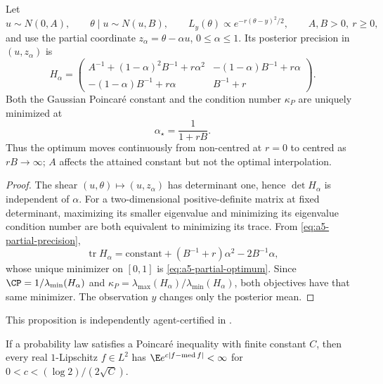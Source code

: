 \documentclass[../../main.tex]{subfiles}
\begin{document}
\begin{proposition}
\label{prop:a5-partial-gaussian}
Let
\[
 u\sim N(0,A),\qquad \theta\mid u\sim N(u,B),\qquad
 L_y(\theta)\propto e^{-r(\theta-y)^2/2},
 \qquad A,B>0,\ r\ge0,
\]
and use the partial coordinate $z_\alpha=\theta-\alpha u$, $0\le\alpha\le1$. Its posterior
precision in $(u,z_\alpha)$ is
\begin{equation}\label{eq:a5-partial-precision}
 H_\alpha=
 \begin{pmatrix}
 A^{-1}+(1-\alpha)^2B^{-1}+r\alpha^2&-(1-\alpha)B^{-1}+r\alpha\\
 -(1-\alpha)B^{-1}+r\alpha&B^{-1}+r
 \end{pmatrix}.
\end{equation}
Both the Gaussian Poincar\'e constant and the condition number $\kappa_P$ are uniquely minimized
at
\begin{equation}\label{eq:a5-partial-optimum}
 \boxed{\alpha_\star=\frac{1}{1+rB}.}
\end{equation}
Thus the optimum moves continuously from non-centred at $r=0$ to centred as $rB\to\infty$;
$A$ affects the attained constant but not the optimal interpolation.
\end{proposition}

\begin{proof}
The shear $(u,\theta)\mapsto(u,z_\alpha)$ has determinant one, hence
$\det H_\alpha$ is independent of $\alpha$. For a two-dimensional positive-definite matrix at
fixed determinant, maximizing its smaller eigenvalue and minimizing its eigenvalue condition
number are both equivalent to minimizing its trace. From \eqref{eq:a5-partial-precision},
\[
 \operatorname{tr}H_\alpha
 =\text{constant}+(B^{-1}+r)\alpha^2-2B^{-1}\alpha,
\]
whose unique minimizer on $[0,1]$ is \eqref{eq:a5-partial-optimum}. Since
$\CP=1/\lambda_{\min}(H_\alpha)$ and
$\kappa_P=\lambda_{\max}(H_\alpha)/\lambda_{\min}(H_\alpha)$, both objectives have that same
minimizer. The observation $y$ changes only the posterior mean.
\end{proof}

\noindent This proposition is independently agent-certified in
.

\begin{lemma}
\label{lem:a5-pi-exp-tail}
If a probability law satisfies a Poincar\'e inequality with finite constant $C$, then every
real $1$-Lipschitz $f\in L^2$ has
$\E e^{c|f-\operatorname{med}f|}<\infty$ for
$0<c<(\log2)/(2\sqrt C)$.
\end{lemma}
\end{document}
